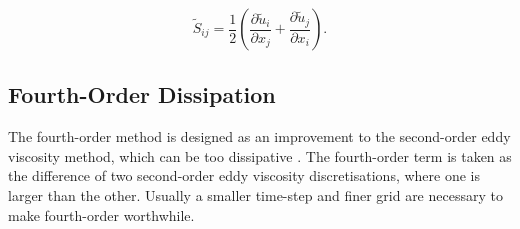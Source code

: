 \begin{equation}
\tilde S_{ij} = \frac 1 2 \left ( \frac{\partial \tilde u_i}{\partial x_j} + \frac{\partial \tilde u_j}{\partial x_i} \right ).
\end{equation}

\subsection{Fourth-Order Dissipation}

The fourth-order method is designed as an improvement to the second-order eddy viscosity method, which can be too dissipative \citep{adam}. The fourth-order term is taken as the difference of two second-order eddy viscosity discretisations, where one is larger than the other. Usually a smaller time-step and finer grid are necessary to make fourth-order worthwhile.
